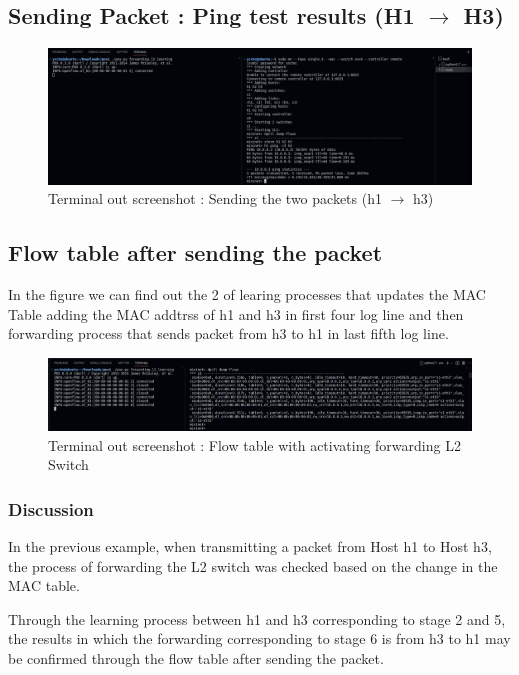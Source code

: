 \subsection{Sending Packet : Ping test results (H1 $\to$ H3)}
\begin{figure}[!h]\centering 
	\includegraphics[width=.99\textwidth]{image/week06/3-1.png}
	\caption{\footnotesize 
	Terminal out screenshot : Sending the two packets (h1 $\to$ h3)}
	\vspace{-10pt}
\end{figure}
\subsection{Flow table after sending the packet}
In the figure we can find out the 2 of learing processes that updates the MAC Table adding the MAC addtrss of h1 and h3 in first four log line and then forwarding process that sends packet from h3 to h1 in last fifth log line.\\
\vspace{-4mm}
\begin{figure}[!h]\centering 
	\includegraphics[width=.99\textwidth]{image/week06/3-2.png}
	\caption{\footnotesize 
	Terminal out screenshot : Flow table with activating forwarding L2 Switch}
	\vspace{-10pt}
\end{figure}
\subsubsection*{Discussion}
In the previous example, when transmitting a packet from Host h1 to Host h3, the process of forwarding the L2 switch was checked based on the change in the MAC table.

Through the learning process between h1 and h3 corresponding to stage 2 and 5, the results in which the forwarding corresponding to stage 6 is from h3 to h1 may be confirmed through the flow table after sending the packet.
